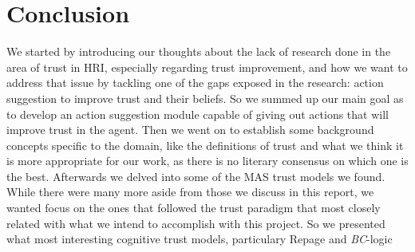 \section{Conclusion}
\label{sec:Conclusion}
We started by introducing our thoughts about the lack of research done in the area of trust in \ac{HRI}, especially regarding trust improvement, and how we want to address that issue by tackling one of the gaps exposed in the research: action suggestion to improve trust and their beliefs. So we summed up our main goal as to develop an action suggestion module capable of giving out actions that will improve trust in the agent. Then we went on to establish some background concepts specific to the domain, like the definitions of trust and what we think it is more appropriate for our work, as there is no literary consensus on which one is the best. Afterwards we delved into some of the \ac{MAS} trust models we found. While there were many more aside from those we discuss in this report, we wanted focus on the ones that followed the trust paradigm that most closely related with what we intend to accomplish with this project. So we presented what most interesting cognitive trust models, particulary Repage and \textit{BC}-logic